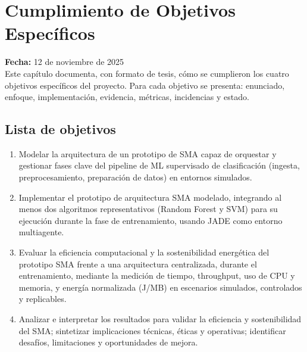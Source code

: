 
\section*{Cumplimiento de Objetivos Específicos}
\noindent\textbf{Fecha:} 12 de noviembre de 2025\\

Este capítulo documenta, con formato de tesis, cómo se cumplieron los cuatro objetivos específicos del proyecto. Para cada objetivo se presenta: enunciado, enfoque, implementación, evidencia, métricas, incidencias y estado.

\subsection*{Lista de objetivos}
\begin{enumerate}
  \item Modelar la arquitectura de un prototipo de SMA capaz de orquestar y gestionar fases clave del pipeline de ML supervisado de clasificación (ingesta, preprocesamiento, preparación de datos) en entornos simulados.
  \item Implementar el prototipo de arquitectura SMA modelado, integrando al menos dos algoritmos representativos (Random Forest y SVM) para su ejecución durante la fase de entrenamiento, usando JADE como entorno multiagente.
  \item Evaluar la eficiencia computacional y la sostenibilidad energética del prototipo SMA frente a una arquitectura centralizada, durante el entrenamiento, mediante la medición de tiempo, throughput, uso de CPU y memoria, y energía normalizada (J/MB) en escenarios simulados, controlados y replicables.
  \item Analizar e interpretar los resultados para validar la eficiencia y sostenibilidad del SMA; sintetizar implicaciones técnicas, éticas y operativas; identificar desafíos, limitaciones y oportunidades de mejora.
\end{enumerate}


